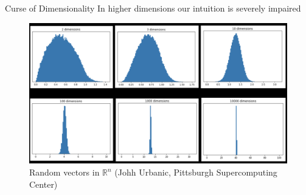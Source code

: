 \documentclass{beamer}
\begin{document}
\begin{frame}{Curse of Dimensionality}
	In higher dimensions our intuition is severely impaired
		\begin{figure}[h]
		\centering
		\includegraphics[scale=0.45]{Figures/fig_curse_dim.png}
		\caption{Random vectors in $\mathbb{R}^n$ (Johh Urbanic, Pittsburgh Supercomputing Center)}
	\end{figure}
	
\end{frame}
\end{document}
